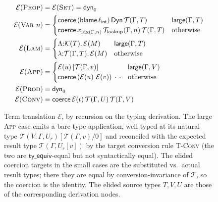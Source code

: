 \documentclass[acmsmall,anonymous=false,nonacm]{acmart}
\newcommand{\dyn}{\ensuremath{\mathsf{Dyn}}}
\newcommand{\blame}[1]{\mathsf{blame}\,#1}
\newcommand{\ext}{\mathcal{E}}
\newcommand{\extt}{\mathcal{T}}
\newcommand{\extk}{\mathcal{K}}
\newcommand{\coerce}[3]{\mathsf{coerce}\,#1\,#2\,#3}
\newcommand{\islarge}{\mathsf{large}}
\newcommand{\dyntoken}{\mathsf{dyn}_0}
\newcommand{\lint}{\ell_{\mathsf{int}}}
\begin{document}
\begin{figure}
\small
\begin{align*}
\ext(\textsc{Prop}) &= \ext(\textsc{Set}) = \dyntoken \\
\ext(\textsc{Var}\ n) &= \begin{cases}
   \coerce{(\blame \lint)}{\dyn}{\extt(\Gamma, T)} & \islarge(\Gamma, T)\\
   \coerce{x_{\mathrm{idx}(\Gamma,n)}}{\extt_{\mathrm{lookup}}(\Gamma, n)}{\extt(\Gamma, T)} & \text{otherwise}
 \end{cases}\\
\ext(\textsc{Lam}) &= \begin{cases}
   \Lambda{:}\extk(T).\,\ext(M) & \islarge(\Gamma, T)\\
   \lambda{:}\extt(\Gamma, T).\,\ext(M) & \text{otherwise}
 \end{cases}\\
\ext(\textsc{App}) &= \begin{cases}
   \ext(u)\,[\extt(\Gamma, v)] & \islarge(\Gamma, V)\\
   \coerce{(\ext(u)\ \ext(v))}{\cdot}{\cdot} & \text{otherwise}
 \end{cases}\\
\ext(\textsc{Prod}) &= \dyntoken \\
\ext(\textsc{Conv}) &= \coerce{\ext(t)}{\extt(\Gamma, U)}{\extt(\Gamma, V)}
\end{align*}
\caption{Term translation $\ext$, by recursion on the typing derivation. The
large \textsc{App} case emits a bare type application, well typed at its natural
type $\extt(V{:}\Gamma,U_r)[\extt(\Gamma,v)/0]$ and reconciled with the expected
result type $\extt(\Gamma,U_r[v])$ by the target conversion rule \textsc{T-Conv}
(the two are $\mathsf{ty\_equiv}$-equal but not syntactically equal). The elided
coercion targets in the small cases are the substituted vs.\ actual result types;
there they are equal by conversion-invariance of $\extt$, so the coercion is the
identity. The elided source types $T, V, U$ are those of the corresponding
derivation nodes.}
\label{fig:ext}
\end{figure}
\end{document}
